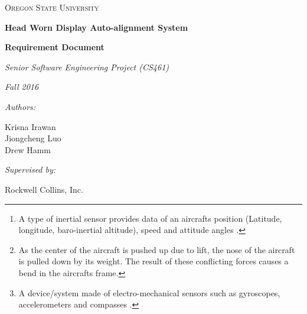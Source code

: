 \documentclass[letterpaper,10pt,notitlepage]{article}
\def\name{Krisna Irawan\\ Jiongcheng Luo\\ Drew Hamm}
\begin{document}
\begin{titlepage}
	\centering
	{\scshape\LARGE Oregon State University\par}
	\vspace{2cm}
	{\huge\bfseries Head Worn Display Auto-alignment System\par}
	\vspace{1cm}
	{\Large\bfseries Requirement Document\par}
	\vspace{1cm}
	{\Large\itshape Senior Software Engineering Project (CS461)\par}
	{\Large\itshape Fall 2016\par}
	\vspace{1cm}
	{\normalsize\itshape Authors:\par}
	{\normalsize \name\par}
	\vspace{1cm}
	{\normalsize\itshape Supervised by:\par}
	{\normalsize Rockwell Collins, Inc.\par}
	\vspace{2cm}

	\begin{abstract}
	A Head-up Display (HUD), is a transparent display that presents all necessary data that pilots need in their flight environment. Currently, the HUD obtains data from an aircraft\textquotesingle s mounted device called inertial reference unit (IRU)\footnote{A type of inertial sensor provides data of an aircraft\textquotesingle s position (Latitude, longitude, baro-inertial altitude), speed and attitude angles \cite{iru}.}, this IRU outputs precise and aligned data to the HUD. However, the current alignment process requires specialized equipment and epoxy which is time consuming, costly, and interrupts production line progress for the original equipment manufacturer. In addition, the resulting HUD alignment, while precise, does not compensate for airframe droop\footnote{As the center of the aircraft is pushed up due to lift, the nose of the aircraft is pulled down by its weight. The result of these conflicting forces causes a bend in the aircraft\textquotesingle s frame. } during flight. Rockwell Collins looks forward to a new alignment methodology utilizing an inexpensive microelectromechanical systems (MEMS)\footnote{A device/system made of electro-mechanical sensors such as gyroscopes, accelerometers and compasses \cite{mems}.} IRU mounted onto the HUD to infer alignment data from the aircraft\textquotesingle s precisely mounted and aligned IRU. This project works on a solution that utilizes the data from both the inexpensive MEMS IRU and the aircraft mounted IRU to develop an algorithm, which aims to output precise and aligned data with reduced installation cost.
\end{abstract}
\end{titlepage}
\tableofcontents
\end{document}
